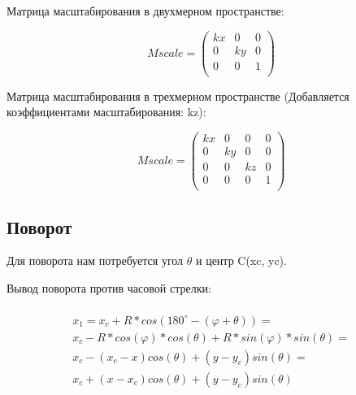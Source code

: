Матрица масштабирования в двухмерном пространстве:

\begin{equation}
Mscale = \left(
\begin{array}{cccc}
kx & 0 & 0 \\
0 & ky & 0 \\
0 & 0 & 1 \\
\end{array}
\right)
\end{equation}

Матрица масштабирования в трехмерном пространстве (Добавляется коэффициентами масштабирования: kz):

\begin{equation}
Mscale = \left(
\begin{array}{cccc}
kx & 0 & 0 & 0 \\
0 & ky & 0 & 0 \\
0 & 0 & kz & 0 \\
0 & 0 & 0 & 1 \\
\end{array}
\right)
\end{equation}

\subsection {Поворот}

Для поворота нам потребуется угол  $\theta$ и центр C(xc, yc).
\begin{figure}[ht!]
\end{figure} 

Вывод поворота против часовой стрелки:

\begin{multline}
\\
x_1 = x_c + R*cos(180^{\circ}-(\varphi +  \theta)) = \\
x_c - R*cos(\varphi)*cos(\theta) + R*sin(\varphi)*sin(\theta) = \\ 
x_c - (x_c - x)cos(\theta) + (y - y_c)sin(\theta) = \\ 
x_c + (x - x_c)cos(\theta) + (y - y_c)sin(\theta) \\
\end{multline}

